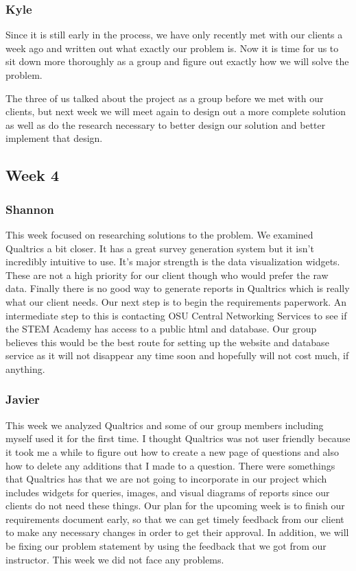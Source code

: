 \documentclass[letterpaper,10pt,serif, draftclsnofoot,onecolumn, compsoc, titlepage]{IEEEtran}
\begin{document}
\subsubsection{Kyle}
Since it is still early in the process, we have only recently met with our clients a week ago and written out what exactly our problem is. Now it is time for us to sit down more thoroughly as a group and figure out exactly how we will solve the problem.

The three of us talked about the project as a group before we met with our clients, but next week we will meet again to design out a more complete solution as well as do the research necessary to better design our solution and better implement that design.
\subsection{Week 4}
\subsubsection{Shannon}
This week focused on researching solutions to the problem. We examined Qualtrics a bit closer. It has a great survey generation system but it isn't incredibly intuitive to use. It's major strength is the data visualization widgets. These are not a high priority for our client though who would prefer the raw data. Finally there is no good way to generate reports in Qualtrics which is really what our client needs. Our next step is to begin the requirements paperwork. An intermediate step to this is contacting OSU Central Networking Services to see if the STEM Academy has access to a public html and database. Our group believes this would be the best route for setting up the website and database service as it will not disappear any time soon and hopefully will not cost much, if anything.
\subsubsection{Javier}
This week we analyzed Qualtrics and some of our group members including myself used it for the first time. I thought Qualtrics was not user friendly because it took me a while to figure out how to create a new page of questions and also how to delete any additions that I made to a question. There were somethings that Qualtrics has that we are not going to incorporate in our project which includes widgets for queries, images, and visual diagrams of reports since our clients do not need these things. Our plan for the upcoming week is to finish our requirements document early, so that we can get timely feedback from our client to make any necessary changes in order to get their approval. In addition, we will be fixing our problem statement by using the feedback that we got from our instructor. This week we did not face any problems.
\end{document}
